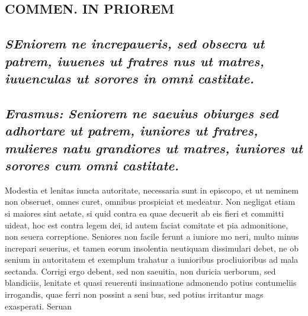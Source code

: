 \documentclass{article}
\begin{document}
\begin{pages}
\section*{COMMEN. IN PRIOREM }
\marginpar{[ p.114 ]}
{}
\subsection*{\textit{\huge\textbf{S}\normalsize Eniorem ne increpaueris, sed obsecra ut patrem, iuuenes ut fratres nus ut matres, iuuenculas ut sorores in omni castitate. }}
{}
\subsection*{\textit{Erasmus: Seniorem ne saeuius obiurges sed adhortare ut patrem, iuniores ut fratres, mulieres natu grandiores ut matres, iuniores ut sorores cum omni castitate. }}\pstart Modestia et lenitas iuncta autoritate, necessaria sunt in episcopo, et ut neminem non obseruet, omnes curet, omnibus prospiciat et medeatur. Non negligat etiam si maiores sint aetate, si quid contra ea quae decuerit ab eis fieri et committi uideat, hoc est contra legem dei, id autem faciat comitate et pia admonitione, non seuera correptione.  \pend\pstart Seniores non facile ferunt a iuniore mo neri, multo minus increpari seuerius, et tamen eorum insolentia neutiquam dissimulari debet, ne ob senium in autoritatem et exemplum trahatur a iunioribus procliuioribus ad mala sectanda. Corrigi ergo debent, sed non saeuitia, non duricia uerborum, sed blandiciis, lenitate et quasi reuerenti insinuatione admonendo potius contumeliis irrogandis, quae ferri non possint a seni bus, sed potius irritantur mags exasperati. Seruan  \pend

\end{pages}
\end{document}

